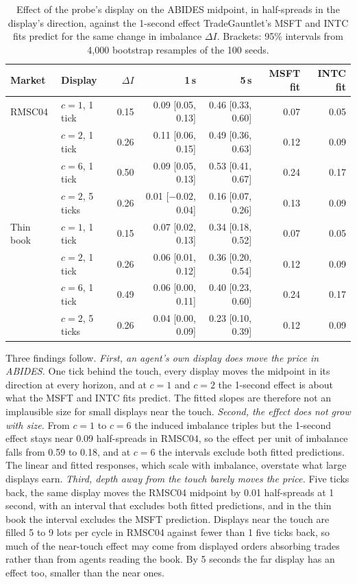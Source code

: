 \documentclass{article}
\begin{document}
\begin{table}[t]
\centering
\caption{Effect of the probe's display on the ABIDES midpoint, in half-spreads in the display's direction, against the 1-second effect TradeGauntlet's MSFT and INTC fits predict for the same change in imbalance $\Delta I$. Brackets: 95\% intervals from 4,000 bootstrap resamples of the 100 seeds.}
\label{tab:abidesresponse}
\small
\begin{tabular}{llrrrrr}
\toprule
Market & Display & $\Delta I$ & 1\,s & 5\,s & MSFT fit & INTC fit \\
\midrule
RMSC04 & $c=1$, 1 tick & 0.15 & 0.09 [0.05, 0.13] & 0.46 [0.33, 0.60] & 0.07 & 0.05 \\
 & $c=2$, 1 tick & 0.26 & 0.11 [0.06, 0.15] & 0.49 [0.36, 0.63] & 0.12 & 0.09 \\
 & $c=6$, 1 tick & 0.50 & 0.09 [0.05, 0.13] & 0.53 [0.41, 0.67] & 0.24 & 0.17 \\
 & $c=2$, 5 ticks & 0.26 & 0.01 [$-0.02$, 0.04] & 0.16 [0.07, 0.26] & 0.13 & 0.09 \\
Thin book & $c=1$, 1 tick & 0.15 & 0.07 [0.02, 0.13] & 0.34 [0.18, 0.52] & 0.07 & 0.05 \\
 & $c=2$, 1 tick & 0.26 & 0.06 [0.01, 0.12] & 0.36 [0.20, 0.54] & 0.12 & 0.09 \\
 & $c=6$, 1 tick & 0.49 & 0.06 [0.00, 0.11] & 0.40 [0.23, 0.60] & 0.24 & 0.17 \\
 & $c=2$, 5 ticks & 0.26 & 0.04 [0.00, 0.09] & 0.23 [0.10, 0.39] & 0.12 & 0.09 \\
\bottomrule
\end{tabular}
\end{table}

Three findings follow. \emph{First, an agent's own display does move the price in ABIDES.} One tick behind the touch, every display moves the midpoint in its direction at every horizon, and at $c = 1$ and $c = 2$ the 1-second effect is about what the MSFT and INTC fits predict. The fitted slopes are therefore not an implausible size for small displays near the touch. \emph{Second, the effect does not grow with size.} From $c = 1$ to $c = 6$ the induced imbalance triples but the 1-second effect stays near 0.09 half-spreads in RMSC04, so the effect per unit of imbalance falls from 0.59 to 0.18, and at $c = 6$ the intervals exclude both fitted predictions. The linear and fitted responses, which scale with imbalance, overstate what large displays earn. \emph{Third, depth away from the touch barely moves the price.} Five ticks back, the same display moves the RMSC04 midpoint by 0.01 half-spreads at 1 second, with an interval that excludes both fitted predictions, and in the thin book the interval excludes the MSFT prediction. Displays near the touch are filled 5 to 9 lots per cycle in RMSC04 against fewer than 1 five ticks back, so much of the near-touch effect may come from displayed orders absorbing trades rather than from agents reading the book. By 5 seconds the far display has an effect too, smaller than the near ones.
\end{document}

